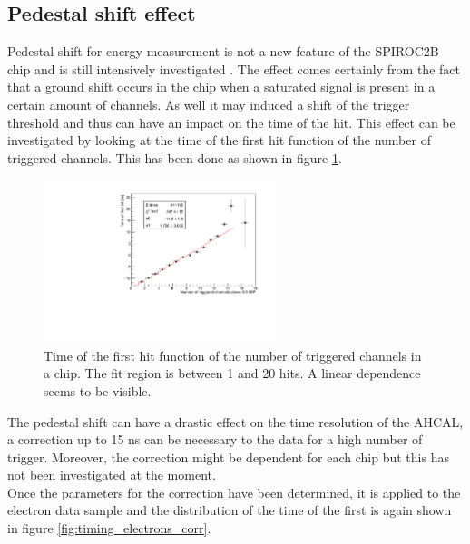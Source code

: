 \documentclass[twoside,a4paper,11pt]{article}
\begin{document}
\subsection{Pedestal shift effect}
\label{subsec:ped_shift}

Pedestal shift for energy measurement is not a new feature of the SPIROC2B chip and is still intensively investigated \cite{OskarMaster}. The effect comes certainly from the fact that a ground shift occurs in the chip when a saturated signal is present in a certain amount of channels. As well it may induced a shift of the trigger threshold and thus can have an impact on the time of the hit. This effect can be investigated by looking at the time of the first hit function of the number of triggered channels. This has been done as shown in figure \ref{fig:nhits_profile}.
\begin{figure}[htbp]
\begin{center}
\includegraphics[width=0.6\textwidth]{fig/NumberHits_Dependance.pdf}
\caption{Time of the first hit function of the number of triggered channels in a chip. The fit region is between 1 and 20 hits. A linear dependence seems to be visible.}
\label{fig:nhits_profile}
\end{center}
\end{figure}
The pedestal shift can have a drastic effect on the time resolution of the AHCAL, a correction up to 15 ns can be necessary to the data for a high number of trigger. Moreover, the correction might be dependent for each chip but this has not been investigated at the moment.\\
Once the parameters for the correction have been determined, it is applied to the electron data sample and the distribution of the time of the first is again shown in figure \ref{fig:timing_electrons_corr}.
\end{document}
